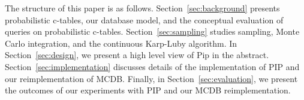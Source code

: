The       structure       of        this       paper       is       as
follows. Section~\ref{sec:background} presents probabilistic c-tables,
our  database  model, and  the  conceptual  evaluation  of queries  on
probabilistic c-tables. Section~\ref{sec:sampling}  studies  sampling,  Monte
Carlo      integration,     and      the      continuous     Karp-Luby
algorithm.  In Section~\ref{sec:design}, we present a high level view of Pip in
the  abstract.   Section~\ref{sec:implementation} discusses details  of the
implementation of  PIP and our reimplementation  of MCDB.    Finally,   in
Section~\ref{sec:evaluation},   we  present   the   outcomes  of   our
experiments with PIP and our MCDB reimplementation.


